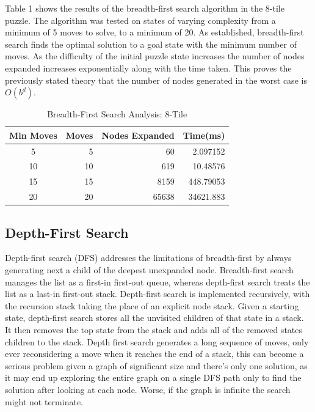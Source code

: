 \documentclass[final]{cmpreport}
\begin{document}
Table 1 shows the results of the breadth-first search algorithm in the 8-tile puzzle. The algorithm was tested on states of varying complexity from a minimum of 5 moves to solve, to  a minimum of 20. As established, breadth-first search finds the optimal solution to a goal state with the minimum number of moves. As the difficulty of the initial puzzle state increases the number of nodes expanded increases exponentially along with the time taken. This proves the previously stated theory that the number of nodes generated in the worst case is $O(b^d)$.


\begin{table}[ht]
	\caption{Breadth-First Search Analysis: 8-Tile}
	\begin{center}
		\begin{tabular}{crrr} \hline
			Min Moves & Moves & Nodes Expanded &Time(ms)  \\ \hline
			5  & 5 & 60& 2.097152 \\
			10 & 10 &619&  10.48576 \\ 
		    15 & 15 & 8159& 448.79053 \\ 
	    	20 & 20& 65638 & 34621.883 \\ \hline
		\end{tabular}
	\end{center}
\end{table}



\subsection{Depth-First Search}
Depth-first search (DFS) addresses the limitations of breadth-first by always generating next a child of the deepest unexpanded node. Breadth-first search manages the list as a first-in first-out queue, whereas depth-first search treats the list as a last-in first-out stack. Depth-first search is implemented recursively, with the recursion stack taking the place of an explicit node stack. Given a starting state, depth-first search stores all the unvisited children of that state in a stack. It then removes the top state from the stack and adds all of the removed states children to the stack. Depth first search generates a long sequence of moves, only ever reconsidering a move when it reaches the end of a stack, this can become a serious problem given a graph of significant size and there's only one solution, as it may end up exploring the entire graph on a single DFS path only to find the solution after looking at each node. Worse, if the graph is infinite the search might not terminate.
\end{document}

